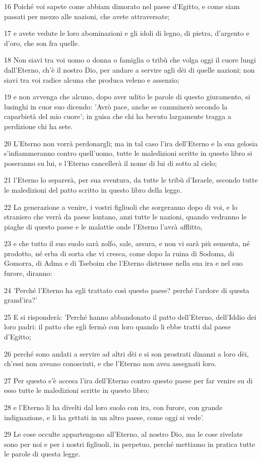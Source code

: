 \par 16 Poiché voi sapete come abbiam dimorato nel paese d'Egitto, e come siam passati per mezzo alle nazioni, che avete attraversate;
\par 17 e avete vedute le loro abominazioni e gli idoli di legno, di pietra, d'argento e d'oro, che son fra quelle.
\par 18 Non siavi tra voi uomo o donna o famiglia o tribù che volga oggi il cuore lungi dall'Eterno, ch'è il nostro Dio, per andare a servire agli dèi di quelle nazioni; non siavi tra voi radice alcuna che produca veleno e assenzio;
\par 19 e non avvenga che alcuno, dopo aver udito le parole di questo giuramento, si lusinghi in cuor suo dicendo: 'Avrò pace, anche se camminerò secondo la caparbietà del mio cuore'; in guisa che chi ha bevuto largamente tragga a perdizione chi ha sete.
\par 20 L'Eterno non vorrà perdonargli; ma in tal caso l'ira dell'Eterno e la sua gelosia s'infiammeranno contro quell'uomo, tutte le maledizioni scritte in questo libro si poseranno su lui, e l'Eterno cancellerà il nome di lui di sotto al cielo;
\par 21 l'Eterno lo separerà, per sua sventura, da tutte le tribù d'Israele, secondo tutte le maledizioni del patto scritto in questo libro della legge.
\par 22 La generazione a venire, i vostri figliuoli che sorgeranno dopo di voi, e lo straniero che verrà da paese lontano, anzi tutte le nazioni, quando vedranno le piaghe di questo paese e le malattie onde l'Eterno l'avrà afflitto,
\par 23 e che tutto il suo suolo sarà zolfo, sale, arsura, e non vi sarà più sementa, né prodotto, né erba di sorta che vi cresca, come dopo la ruina di Sodoma, di Gomorra, di Adma e di Tseboim che l'Eterno distrusse nella sua ira e nel suo furore, diranno:
\par 24 'Perché l'Eterno ha egli trattato così questo paese? perché l'ardore di questa grand'ira?'
\par 25 E si risponderà: 'Perché hanno abbandonato il patto dell'Eterno, dell'Iddio dei loro padri: il patto che egli fermò con loro quando li ebbe tratti dal paese d'Egitto;
\par 26 perché sono andati a servire ad altri dèi e si son prostrati dinanzi a loro dèi, ch'essi non aveano conosciuti, e che l'Eterno non avea assegnati loro.
\par 27 Per questo s'è accesa l'ira dell'Eterno contro questo paese per far venire su di esso tutte le maledizioni scritte in questo libro;
\par 28 e l'Eterno li ha divelti dal loro suolo con ira, con furore, con grande indignazione, e li ha gettati in un altro paese, come oggi si vede'.
\par 29 Le cose occulte appartengono all'Eterno, al nostro Dio, ma le cose rivelate sono per noi e per i nostri figliuoli, in perpetuo, perché mettiamo in pratica tutte le parole di questa legge.


